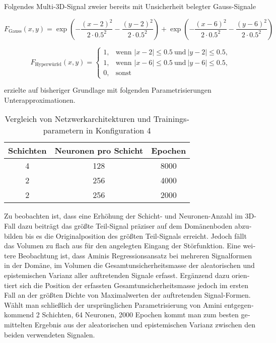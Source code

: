 \begin{otherlanguage}{ngerman}
Folgendes Multi-3D-Signal zweier bereits mit Unsicherheit belegter Gauss-Signale 

\[
F_{\text{Gauss}}(x, y) =
\exp\!\left( -\frac{(x - 2)^2}{2 \cdot 0.5^2} - \frac{(y - 2)^2}{2 \cdot 0.5^2} \right)
+ \exp\!\left( -\frac{(x - 6)^2}{2 \cdot 0.5^2} - \frac{(y - 6)^2}{2 \cdot 0.5^2} \right)
\]

\[
F_{\text{Hyperwürfel}}(x, y) =
\begin{cases}
1, & \text{wenn } |x - 2| \leq 0.5 \ \text{und} \ |y - 2| \leq 0.5, \\
1, & \text{wenn } |x - 6| \leq 0.5 \ \text{und} \ |y - 6| \leq 0.5, \\
0, & \text{sonst}
\end{cases}
\]

erzielte auf bisheriger Grundlage mit folgenden Parametrisierungen Unterapproximationen. 

\begin{table}[h!]
\centering
\begin{tabular}{|c|c|c|}
\hline
\textbf{Schichten} & \textbf{Neuronen pro Schicht} & \textbf{Epochen} \\
\hline
4 & 128 & 8000 \\
2 & 256 & 4000 \\
2 & 256 & 2000 \\
\hline
\end{tabular}
\caption{Vergleich von Netzwerkarchitekturen und Trainingsparametern in Konfiguration 4}
\end{table}

Zu beobachten ist, dass eine Erhöhung der Schicht- und Neuronen-Anzahl im 3D-Fall dazu beiträgt das größte Teil-Signal präziser auf dem Domänenboden abzubilden bis es die Originalposition des größten Teil-Signals erreicht. Jedoch fällt das Volumen zu flach aus für den angelegten Eingang der Störfunktion. Eine weitere Beobachtung ist, dass Aminis Regressionsansatz bei mehreren Signalformen in der Domäne, im Volumen die Gesamtunsicherheitsmasse der aleatorischen und epistemischen Varianz aller auftretenden Signale erfasst. Ergänzend dazu orientiert sich die Position der erfassten Gesamtunsicherheitsmasse jedoch im ersten Fall an der größten Dichte von Maximalwerten der auftretenden Signal-Formen. Wählt man schließlich der ursprünglichen Parametrisierung von Amini entgegenkommend 2 Schichten, 64 Neuronen, 2000 Epochen kommt man zum besten gemittelten Ergebnis aus der aleatorischen und epistemischen Varianz zwischen den beiden verwendeten Signalen. 


\end{otherlanguage}
